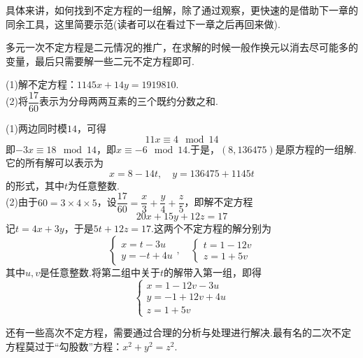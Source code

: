 \documentclass[lang=cn, zihao=5]{elegantbook}
\begin{document}
具体来讲，如何找到不定方程的一组解，除了通过观察，更快速的是借助下一章的同余工具，这里简要示范(读者可以在看过下一章之后再回来做).

多元一次不定方程是二元情况的推广，在求解的时候一般作换元以消去尽可能多的变量，最后只需要解一些二元不定方程即可.

\begin{example}
	(1)解不定方程：$1145x+14y=1919810$. \\
	(2)将$\dfrac{17}{60}$表示为分母两两互素的三个既约分数之和.
\end{example}
\begin{solution}
	(1)两边同时模$14$，可得$$11x \equiv 4 \mod 14$$
	即$-3x \equiv 18 \mod 14$，即$x \equiv -6 \mod 14$.于是，$(8,136475)$是原方程的一组解.它的所有解可以表示为$$x=8-14t,\quad y=136475+1145t$$
	的形式，其中$t$为任意整数. \\
	(2)由于$60=3 \times 4 \times 5$，设$\dfrac{17}{60} = \dfrac{x}{3} + \dfrac{y}{4} + \dfrac{z}{5}$，即解不定方程$$20x+15y+12z=17$$
	记$t=4x+3y$，于是$5t+12z=17$.这两个不定方程的解分别为$$\begin{cases}
		x=t-3u \\ y=-t+4u
	\end{cases}, \quad \begin{cases}
		t=1-12v \\ z=1+5v
	\end{cases}$$
	其中$u,v$是任意整数.将第二组中关于$t$的解带入第一组，即得$$\begin{cases}
		x=1-12v-3u \\ y=-1+12v+4u \\ z=1+5v
	\end{cases}$$
\end{solution}

还有一些高次不定方程，需要通过合理的分析与处理进行解决.最有名的二次不定方程莫过于“勾股数”方程：$x^2+y^2=z^2$.
\end{document}
